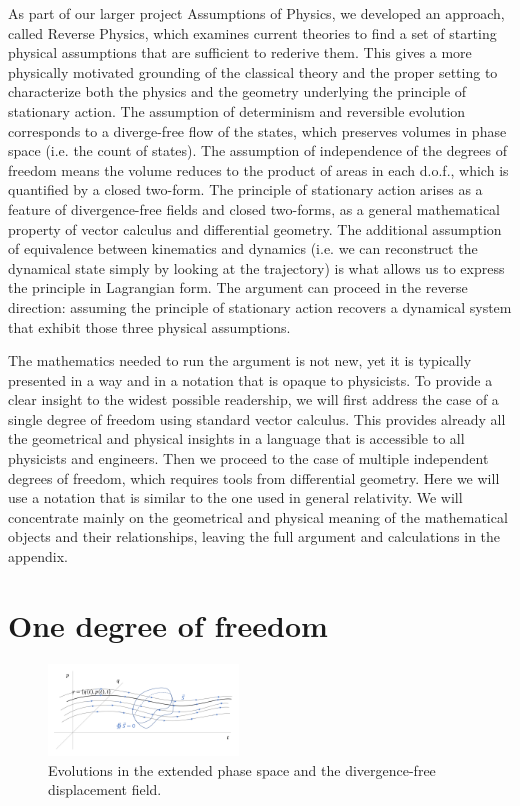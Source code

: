 \documentclass[10pt,twocolumn, nofootinbib]{revtex4-2}
\begin{document}
As part of our larger project Assumptions of Physics, we developed an approach, called Reverse Physics, which examines current theories to find a set of starting physical assumptions that are sufficient to rederive them. This gives a more physically motivated grounding of the classical theory and the proper setting to characterize both the physics and the geometry underlying the principle of stationary action. The assumption of determinism and reversible evolution corresponds to a diverge-free flow of the states, which preserves volumes in phase space (i.e. the count of states). The assumption of independence of the degrees of freedom means the volume reduces to the product of areas in each d.o.f., which is quantified by a closed two-form. The principle of stationary action arises as a feature of divergence-free fields and closed two-forms, as a general mathematical property of vector calculus and differential geometry\cite{souriau1997structure}. The additional assumption of equivalence between kinematics and dynamics (i.e. we can reconstruct the dynamical state simply by looking at the trajectory) is what allows us to express the principle in Lagrangian form. The argument can proceed in the reverse direction: assuming the principle of stationary action recovers a dynamical system that exhibit those three physical assumptions.

The mathematics needed to run the argument is not new, yet it is typically presented in a way and in a notation that is opaque to physicists. To provide a clear insight to the widest possible readership, we will first address the case of a single degree of freedom using standard vector calculus. This provides already all the geometrical and physical insights in a language that is accessible to all physicists and engineers. Then we proceed to the case of multiple independent degrees of freedom, which requires tools from differential geometry. Here we will use a notation that is similar to the one used in general relativity. We will concentrate mainly on the geometrical and physical meaning of the mathematical objects and their relationships, leaving the full argument and calculations in the appendix.

\section{One degree of freedom}

\begin{figure}
	\includegraphics[width = 0.45\textwidth]{ExtendedPhaseSpace}
	\caption{\footnotesize{Evolutions in the extended phase space and the divergence-free displacement field.}}\label{extended_phase_space}
\end{figure}
\end{document}
